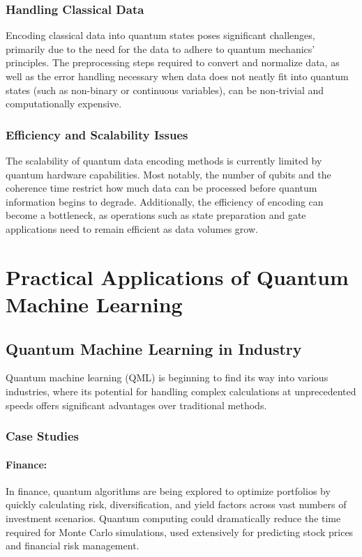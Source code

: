 \documentclass{book}
\begin{document}
\subsubsection{Handling Classical Data}
Encoding classical data into quantum states poses significant challenges, primarily due to the need for the data to adhere to quantum mechanics' principles. The preprocessing steps required to convert and normalize data, as well as the error handling necessary when data does not neatly fit into quantum states (such as non-binary or continuous variables), can be non-trivial and computationally expensive.

\subsubsection{Efficiency and Scalability Issues}
The scalability of quantum data encoding methods is currently limited by quantum hardware capabilities. Most notably, the number of qubits and the coherence time restrict how much data can be processed before quantum information begins to degrade. Additionally, the efficiency of encoding can become a bottleneck, as operations such as state preparation and gate applications need to remain efficient as data volumes grow.
\section{Practical Applications of Quantum Machine Learning}

\subsection{Quantum Machine Learning in Industry}
Quantum machine learning (QML) is beginning to find its way into various industries, where its potential for handling complex calculations at unprecedented speeds offers significant advantages over traditional methods.

\subsubsection{Case Studies}
\paragraph{Finance:} In finance, quantum algorithms are being explored to optimize portfolios by quickly calculating risk, diversification, and yield factors across vast numbers of investment scenarios. Quantum computing could dramatically reduce the time required for Monte Carlo simulations, used extensively for predicting stock prices and financial risk management.
\end{document}
